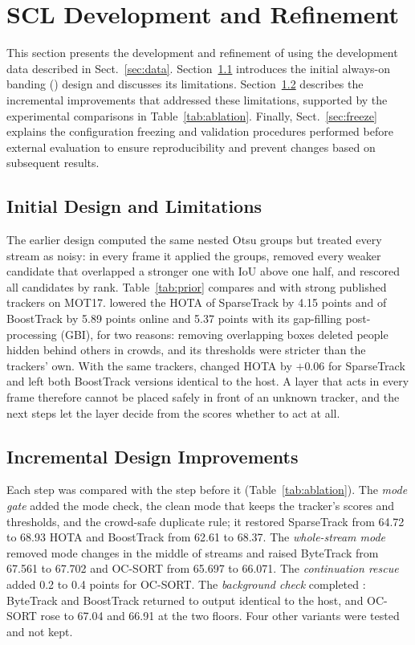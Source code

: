 \section{SCL Development and Refinement}\label{sec:development}

This section presents the development and refinement of \scl{} using the development data
described in Sect.~\ref{sec:data}. Section~\ref{sec:prior} introduces the initial always-on banding
(\aob{}) design and discusses its limitations. Section~\ref{sec:steps} describes the incremental
improvements that addressed these limitations, supported by the experimental comparisons in
Table~\ref{tab:ablation}. Finally, Sect.~\ref{sec:freeze} explains the configuration freezing and
validation procedures performed before external evaluation to ensure reproducibility and prevent
changes based on subsequent results.



\subsection{Initial Design and Limitations}\label{sec:prior}
The earlier design \aob{} computed the same nested Otsu groups but treated every stream as noisy:
in every frame it applied the groups, removed every weaker candidate that overlapped a stronger one
with IoU above one half, and rescored all candidates by rank. Table~\ref{tab:prior} compares \aob{}
and \scl{} with strong published trackers on MOT17. \aob{} lowered the HOTA of SparseTrack by 4.15
points and of BoostTrack by 5.89 points online and 5.37 points with its gap-filling post-processing
(GBI), for two reasons: removing overlapping boxes deleted people hidden behind others in crowds,
and its thresholds were stricter than the trackers' own. With the same trackers, \scl{} changed
HOTA by $+0.06$ for SparseTrack and left both BoostTrack versions identical to the host. A layer
that acts in every frame therefore cannot be placed safely in front of an unknown tracker, and the
next steps let the layer decide from the scores whether to act at all.


\subsection{Incremental Design Improvements}\label{sec:steps}
Each step was compared with the step before it (Table~\ref{tab:ablation}). The \emph{mode gate}
added the mode check, the clean mode that keeps the tracker's scores and thresholds, and the crowd-safe duplicate
rule; it restored SparseTrack from 64.72 to 68.93 HOTA and BoostTrack from 62.61 to 68.37. The
\emph{whole-stream mode} removed mode changes in the middle of streams and raised ByteTrack from
67.561 to 67.702 and OC-SORT from 65.697 to 66.071. The \emph{continuation rescue} added 0.2 to 0.4
points for OC-SORT. The \emph{background check} completed \scl{}: ByteTrack and BoostTrack returned
to output identical to the host, and OC-SORT rose to 67.04 and 66.91 at the two floors. Four other
variants were tested and not kept.



